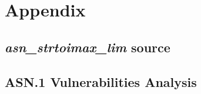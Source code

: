 \documentclass[10p,conference]{IEEEtran}
\begin{document}
 \onecolumn
\section*{Appendix}

\subsection{\emph{asn\_strtoimax\_lim} source}

\label{sec:stritomax}



 \onecolumn
\subsection{ASN.1 Vulnerabilities Analysis}
\end{document}
